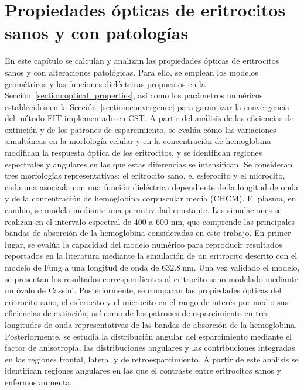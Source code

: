 \chapter{Propiedades ópticas de eritrocitos sanos y con patologías}
\label{chapter:Resultados}

	En este capítulo se calculan y analizan las propiedades ópticas de eritrocitos sanos y con alteraciones patológicas. Para ello, se emplean los modelos geométricos y las funciones dieléctricas propuestos en la Sección~\ref{section:optical_properties}, así como los parámetros numéricos establecidos en la Sección~\ref{section:convergence} para garantizar la convergencia del método FIT implementado en CST. A partir del análisis de las eficiencias de extinción y de los patrones de esparcimiento, se evalúa cómo las variaciones simultáneas en la morfología celular y en la concentración de hemoglobina modifican la respuesta óptica de los eritrocitos, y se identifican regiones espectrales y angulares en las que estas diferencias se intensifican. Se consideran tres morfologías representativas: el eritrocito sano, el esferocito y el microcito, cada una asociada con una función dieléctrica dependiente de la longitud de onda y de la concentración de hemoglobina corpuscular media (CHCM).  El plasma, en cambio, se modela mediante una permitividad constante. Las simulaciones se realizan en el intervalo espectral de 400 a 600 nm, que comprende las principales bandas de absorción de la hemoglobina consideradas en este trabajo. En primer lugar, se evalúa la capacidad del modelo numérico para reproducir resultados reportados en la literatura mediante la simulación de un eritrocito descrito con el modelo de Fung \cite{fungBiomechanicsMechanicalProperties1990} a una longitud de onda de $632.8~\text{nm}$. Una vez validado el modelo, se presentan los resultados correspondientes al eritrocito sano modelado mediante un óvalo de Cassini. Posteriormente, se comparan las propiedades ópticas del eritrocito sano, el esferocito y el microcito en el rango de interés por medio sus eficiencias de extinción, así como de los patrones de esparcimiento en tres longitudes de onda representativas de las bandas de absorción de la hemoglobina. Posteriormente, se estudia la distribución angular del esparcimiento mediante el factor de anisotropía, las distribuciones angulares y las contribuciones integradas en las regiones frontal, lateral y de retroesparcimiento. A partir de este análisis se identifican regiones angulares en las que el contraste entre eritrocitos sanos y enfermos aumenta.

